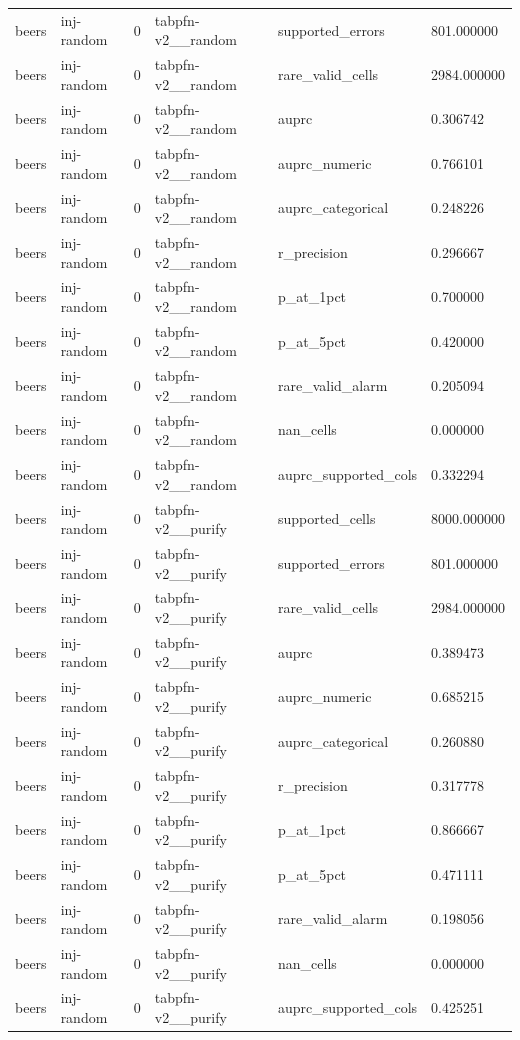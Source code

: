 \begin{tabular}{llllll}
beers & inj-random & 0 & tabpfn-v2\_\_random & supported\_errors & 801.000000 \\
beers & inj-random & 0 & tabpfn-v2\_\_random & rare\_valid\_cells & 2984.000000 \\
beers & inj-random & 0 & tabpfn-v2\_\_random & auprc & 0.306742 \\
beers & inj-random & 0 & tabpfn-v2\_\_random & auprc\_numeric & 0.766101 \\
beers & inj-random & 0 & tabpfn-v2\_\_random & auprc\_categorical & 0.248226 \\
beers & inj-random & 0 & tabpfn-v2\_\_random & r\_precision & 0.296667 \\
beers & inj-random & 0 & tabpfn-v2\_\_random & p\_at\_1pct & 0.700000 \\
beers & inj-random & 0 & tabpfn-v2\_\_random & p\_at\_5pct & 0.420000 \\
beers & inj-random & 0 & tabpfn-v2\_\_random & rare\_valid\_alarm & 0.205094 \\
beers & inj-random & 0 & tabpfn-v2\_\_random & nan\_cells & 0.000000 \\
beers & inj-random & 0 & tabpfn-v2\_\_random & auprc\_supported\_cols & 0.332294 \\
beers & inj-random & 0 & tabpfn-v2\_\_purify & supported\_cells & 8000.000000 \\
beers & inj-random & 0 & tabpfn-v2\_\_purify & supported\_errors & 801.000000 \\
beers & inj-random & 0 & tabpfn-v2\_\_purify & rare\_valid\_cells & 2984.000000 \\
beers & inj-random & 0 & tabpfn-v2\_\_purify & auprc & 0.389473 \\
beers & inj-random & 0 & tabpfn-v2\_\_purify & auprc\_numeric & 0.685215 \\
beers & inj-random & 0 & tabpfn-v2\_\_purify & auprc\_categorical & 0.260880 \\
beers & inj-random & 0 & tabpfn-v2\_\_purify & r\_precision & 0.317778 \\
beers & inj-random & 0 & tabpfn-v2\_\_purify & p\_at\_1pct & 0.866667 \\
beers & inj-random & 0 & tabpfn-v2\_\_purify & p\_at\_5pct & 0.471111 \\
beers & inj-random & 0 & tabpfn-v2\_\_purify & rare\_valid\_alarm & 0.198056 \\
beers & inj-random & 0 & tabpfn-v2\_\_purify & nan\_cells & 0.000000 \\
beers & inj-random & 0 & tabpfn-v2\_\_purify & auprc\_supported\_cols & 0.425251 \\

\end{tabular}
